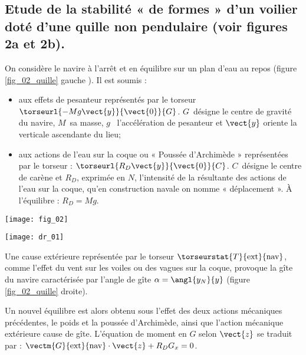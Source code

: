 \subsection{Etude de la stabilité « de formes » d’un voilier doté d’une quille non pendulaire (voir figures 2a et 2b).}

\ifprof
\else
On considère le navire à l’arrêt et en équilibre sur un plan d’eau au repos (figure \ref{fig_02_quille} gauche ). Il est soumis :
\begin{itemize}
\item aux effets de pesanteur représentés par le torseur $\torseurl{-Mg\vect{y}}{\vect{0}}{G}$. $G$~désigne le centre de gravité du navire, $M$~sa masse, $g$~ l’accélération de pesanteur et $\vect{y}$ oriente la verticale ascendante du lieu; 
\item aux actions de l’eau sur la coque ou « Poussée d’Archimède » représentées par le torseur : $\torseurl{R_D\vect{y}}{\vect{0}}{C}$. $C$~désigne le centre de carène et $R_D$, exprimée en $N$,  l’intensité  de la résultante des actions de l’eau sur la coque, qu’en construction navale on nomme « déplacement ». À l’équilibre : $R_D = Mg$.
\end{itemize}

\begin{minipage}[c]{.47\linewidth}
\begin{center}
\texttt{[image: fig\_02]}
\end{center}
\end{minipage} \hfill
\begin{minipage}[c]{.47\linewidth}
\begin{center}
\texttt{[image: dr\_01]}
\end{center}
\end{minipage}

\vspace{.5cm}

Une cause extérieure représentée par le torseur $\torseurstat{T}{\text{ext}}{\text{nav}}$, comme l’effet du vent sur les voiles ou des vagues sur la coque, provoque la gîte du navire caractérisée par l’angle de gîte $\alpha=\angl{{y_N}}{{y}}$  (figure \ref{fig_02_quille} droite).

Un nouvel équilibre est alors obtenu sous l’effet des deux actions mécaniques précédentes, le poids et la poussée d’Archimède, ainsi que l’action mécanique extérieure cause de gîte.
L’équation de moment en $G$ selon $\vect{z}$ se traduit par : $\vectm{G}{\text{ext}}{\text{nav}}\cdot \vect{z} + R_D G_x = 0$.

